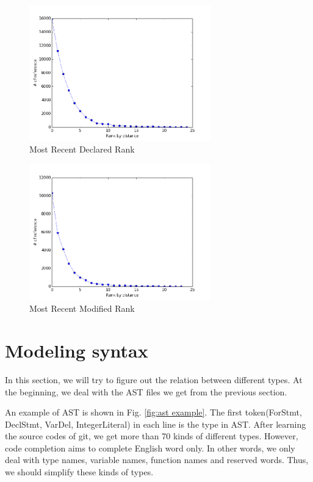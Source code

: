 \documentclass[prodmode,acmtecs]{acmsmall} %
\begin{document}
\begin{figure}
\centerline{\includegraphics[width=0.7\textwidth]{declare_rank_distance}}
\caption{Most Recent Declared Rank}
\label{fig:declare_rank_distance}
\end{figure}
                                                           
\begin{figure}
\centerline{\includegraphics[width=0.7\textwidth]{assign_rank_distance}}
\caption{Most Recent Modified Rank}
\label{fig:assign_rank_distance}
\end{figure}


\section{Modeling syntax}
In this section, we will try to figure out the relation between different types. At the beginning, we deal with the AST files we get from the previous section. 

An example of AST is shown in Fig. \ref{fig:ast example}. The first token(ForStmt, DeclStmt, VarDel, IntegerLiteral) in each line is the type in AST. After learning the source codes of git\cite{torvalds2010git}, we get more than 70 kinds of different types. However, code completion aims to complete English word only. In other words, we only deal with type names, variable names, function names and reserved words. Thus, we should simplify these kinds of types. 
\end{document}
